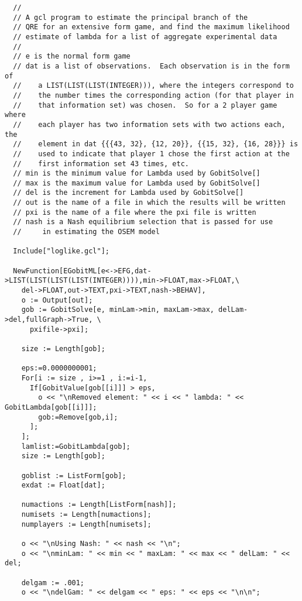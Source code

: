 {\scriptsize
\begin{verbatim}
  //
  // A gcl program to estimate the principal branch of the 
  // QRE for an extensive form game, and find the maximum likelihood 
  // estimate of lambda for a list of aggregate experimental data
  // 
  // e is the normal form game
  // dat is a list of observations.  Each observation is in the form of  
  //    a LIST(LIST(LIST(INTEGER))), where the integers correspond to
  //    the number times the corresponding action (for that player in
  //    that information set) was chosen.  So for a 2 player game where
  //    each player has two information sets with two actions each, the 
  //    element in dat {{{43, 32}, {12, 20}}, {{15, 32}, {16, 28}}} is 
  //    used to indicate that player 1 chose the first action at the
  //    first information set 43 times, etc.  
  // min is the minimum value for Lambda used by GobitSolve[]
  // max is the maximum value for Lambda used by GobitSolve[]
  // del is the increment for Lambda used by GobitSolve[]
  // out is the name of a file in which the results will be written
  // pxi is the name of a file where the pxi file is written
  // nash is a Nash equilibrium selection that is passed for use
  //     in estimating the OSEM model 

  Include["loglike.gcl"];

  NewFunction[EGobitML[e<->EFG,dat->LIST(LIST(LIST(LIST(INTEGER)))),min->FLOAT,max->FLOAT,\
    del->FLOAT,out->TEXT,pxi->TEXT,nash->BEHAV],
    o := Output[out];
    gob := GobitSolve[e, minLam->min, maxLam->max, delLam->del,fullGraph->True, \
      pxifile->pxi];

    size := Length[gob];

    eps:=0.0000000001;
    For[i := size , i>=1 , i:=i-1,
      If[GobitValue[gob[[i]]] > eps, 
        o << "\nRemoved element: " << i << " lambda: " << GobitLambda[gob[[i]]];
        gob:=Remove[gob,i]; 
      ];
    ];
    lamlist:=GobitLambda[gob];
    size := Length[gob];

    goblist := ListForm[gob];
    exdat := Float[dat];

    numactions := Length[ListForm[nash]];
    numisets := Length[numactions];
    numplayers := Length[numisets];

    o << "\nUsing Nash: " << nash << "\n";
    o << "\nminLam: " << min << " maxLam: " << max << " delLam: " << del;

    delgam := .001;
    o << "\ndelGam: " << delgam << " eps: " << eps << "\n\n";


\end{verbatim}}
